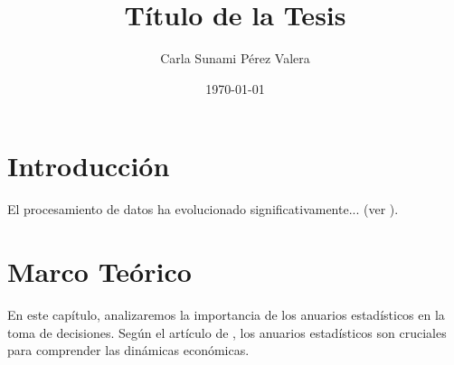\documentclass[12pt]{report} %
\title{Título de la Tesis}
\author{Carla Sunami Pérez Valera}
\date{\today}
\begin{document}
\maketitle

\tableofcontents %

\chapter*{Introducción} %

El procesamiento de datos ha evolucionado significativamente... (ver \cite{autor3}).

\chapter{Marco Teórico}

En este capítulo, analizaremos la importancia de los anuarios estadísticos en la toma de decisiones. Según el artículo de \cite{autor3}, los anuarios estadísticos son cruciales para comprender las dinámicas económicas.

\printbibliography
\end{document}
